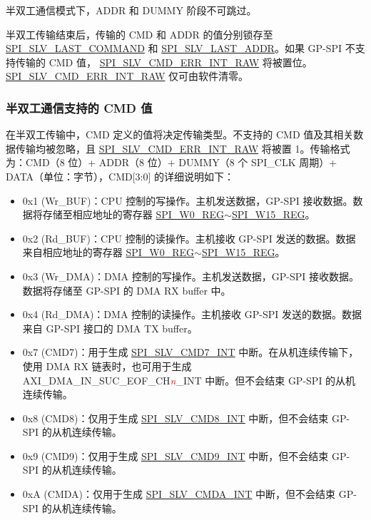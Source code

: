 \documentclass[main\_\_CN.tex]{subfiles}
\begin{document}
\begin{tiplisting}
半双工通信模式下，ADDR 和 DUMMY 阶段不可跳过。
\end{tiplisting}
\vspace{-1em}

半双工传输结束后，传输的 CMD 和 ADDR 的值分别锁存至 \hyperref[fielddesc:SPISLVLASTCOMMAND]{SPI\_SLV\_LAST\_COMMAND} 和 \hyperref[fielddesc:SPISLVLASTADDR]{SPI\_SLV\_LAST\_ADDR}。如果 GP-SPI 不支持传输的 CMD 值， \hyperref[fielddesc:SPISLVCMDERRINTRAW]{SPI\_SLV\_CMD\_ERR\_INT\_RAW} 将被置位。 \hyperref[fielddesc:SPISLVCMDERRINTRAW]{SPI\_SLV\_CMD\_ERR\_INT\_RAW} 仅可由软件清零。

\subsubsection{半双工通信支持的 CMD 值} \label{GP-SPI HD salve format}  

在半双工传输中，CMD 定义的值将决定传输类型。不支持的 CMD 值及其相关数据传输均被忽略，且 \hyperref[fielddesc:SPISLVCMDERRINTRAW]{SPI\_SLV\_CMD\_ERR\_INT\_RAW} 将被置 1。传输格式为：CMD（8 位）+ ADDR（8 位）+ DUMMY（8 个 SPI\_CLK 周期）+ DATA（单位：字节），CMD[3:0] 的详细说明如下：

\begin{itemize}
    \item \label{cmd:wrbuf} 0x1 (Wr\_BUF)：CPU 控制的写操作。主机发送数据，GP-SPI 接收数据。数据将存储至相应地址的寄存器 \hyperref[regdesc:SPIW0REG]{SPI\_W0\_REG}$\sim$\hyperref[regdesc:SPIW15REG]{SPI\_W15\_REG}。
    \item \label{cmd:rdbuf} 0x2 (Rd\_BUF)：CPU 控制的读操作。主机接收 GP-SPI 发送的数据。数据来自相应地址的寄存器 \hyperref[regdesc:SPIW0REG]{SPI\_W0\_REG}$\sim$\hyperref[regdesc:SPIW15REG]{SPI\_W15\_REG}。    
    \item \label{cmd:wrdma} 0x3 (Wr\_DMA)：DMA 控制的写操作。主机发送数据，GP-SPI 接收数据。数据将存储至 GP-SPI 的 DMA RX buffer 中。
    \item \label{cmd:rddma} 0x4 (Rd\_DMA)：DMA 控制的读操作。主机接收 GP-SPI 发送的数据。数据来自 GP-SPI 接口的 DMA TX buffer。
    \item \label{cmd:CMD7} 0x7 (CMD7)：用于生成 \hyperref[int:SPISLVCMD7INT]{SPI\_SLV\_CMD7\_INT} 中断。在从机连续传输下，使用 DMA RX 链表时，也可用于生成 AXI\_DMA\_IN\_SUC\_EOF\_CH\textcolor{red}{\it{n}}\_INT  中断。但不会结束 GP-SPI 的从机连续传输。
    \item 0x8 (CMD8)：仅用于生成 \hyperref[int:SPISLVCMD8INT]{SPI\_SLV\_CMD8\_INT} 中断，但不会结束 GP-SPI 的从机连续传输。
    \item 0x9 (CMD9)：仅用于生成 \hyperref[int:SPISLVCMD9INT]{SPI\_SLV\_CMD9\_INT} 中断，但不会结束 GP-SPI 的从机连续传输。
    \item 0xA (CMDA)：仅用于生成 \hyperref[int:SPISLVCMDAINT]{SPI\_SLV\_CMDA\_INT} 中断，但不会结束 GP-SPI 的从机连续传输。
\end{itemize}
\end{document}
